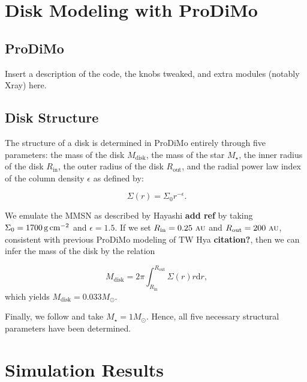 \documentclass[12pt,preprint]{aastex}
\newcommand{\unit}[1]{\,{\rm #1}}
\newcommand{\gcmsq}{\unit{g\,cm^{-2}}}
\newcommand{\au}{\,\textsc{au}}
\newcommand{\remark}[1]{{\color{red}\bf#1}} %
\begin{document}


\section{Disk Modeling with ProDiMo}
\label{sec:prodimo}

\subsection{ProDiMo}

Insert a description of the code, the knobs tweaked, and extra modules
(notably Xray) here.

\subsection{Disk Structure}
The structure of a disk is determined in ProDiMo entirely through five
parameters: the mass of the disk $M_{\mathrm{disk}}$, the mass of the
star $M_\star$, the inner radius of the disk $R_{\mathrm{in}}$, the
outer radius of the disk $R_{\mathrm{out}}$, and the radial power law
index of the column density $\epsilon$ as defined by:

\begin{equation}
\ \Sigma\left(r\right) = \Sigma_0 r^{-\epsilon} .
\end{equation} 

We emulate the MMSN as described by Hayashi \remark{add ref} by taking
$\Sigma_0 =1700\gcmsq$ and $\epsilon = 1.5$. If
we set $R_\mathrm{in}  = 0.25\,\au$ and $R_\mathrm{out} = 200\,\au$,
consistent with previous ProDiMo modeling of TW Hya \remark{citation?},
then we can infer the mass of the disk by the relation

\begin{equation}
\ M_{\mathrm{disk}} = 2\pi \int_{R_{\mathrm{in}}}^{R_\mathrm{out}} \!
\Sigma\left(r\right) r \mathrm{d}r ,
\end{equation}
which yields $M_\mathrm{disk} = 0.033 M_\odot$. 

Finally, we follow \citet{Bai+Goodman2009} and take $M_\star = 1 M_\odot$. Hence, all five
necessary structural parameters have been determined.

\section{Simulation Results}
\end{document}
